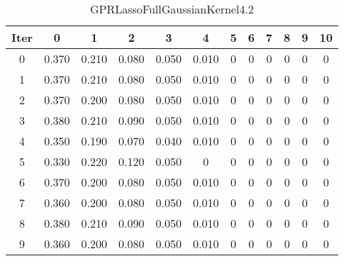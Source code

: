 \begin{table}
	\begin{center}
		\begin{tabular}{|c|c|c|c|c|c|c|c|c|c|c|c|}
			\hline
			Iter & 0 & 1 & 2 & 3 & 4 & 5 & 6 & 7 & 8 & 9 & 10 \\
			\hline
			0 & 0.370 & 0.210 & 0.080 & 0.050 & 0.010 & 0 & 0 & 0 & 0 & 0 & 0 \\
			\hline
			1 & 0.370 & 0.210 & 0.080 & 0.050 & 0.010 & 0 & 0 & 0 & 0 & 0 & 0 \\
			\hline
			2 & 0.370 & 0.200 & 0.080 & 0.050 & 0.010 & 0 & 0 & 0 & 0 & 0 & 0 \\
			\hline
			3 & 0.380 & 0.210 & 0.090 & 0.050 & 0.010 & 0 & 0 & 0 & 0 & 0 & 0 \\
			\hline
			4 & 0.350 & 0.190 & 0.070 & 0.040 & 0.010 & 0 & 0 & 0 & 0 & 0 & 0 \\
			\hline
			5 & 0.330 & 0.220 & 0.120 & 0.050 & 0 & 0 & 0 & 0 & 0 & 0 & 0 \\
			\hline
			6 & 0.370 & 0.200 & 0.080 & 0.050 & 0.010 & 0 & 0 & 0 & 0 & 0 & 0 \\
			\hline
			7 & 0.360 & 0.200 & 0.080 & 0.050 & 0.010 & 0 & 0 & 0 & 0 & 0 & 0 \\
			\hline
			8 & 0.380 & 0.210 & 0.090 & 0.050 & 0.010 & 0 & 0 & 0 & 0 & 0 & 0 \\
			\hline
			9 & 0.360 & 0.200 & 0.080 & 0.050 & 0.010 & 0 & 0 & 0 & 0 & 0 & 0 \\
			\hline
		\end{tabular}
	\end{center}
	\caption{GPRLassoFullGaussianKernel4.2}
\end{table}